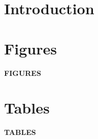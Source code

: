 \documentclass[11pt, a4paper]{article} %
\begin{document}
\newpage



\section{Introduction}\label{sec_mlch:introduction}

 
 

 


\newpage






\newpage
\TODO\section{Figures}
\vspace*{\fill}
{\Huge \begin{center}\textbf{FIGURES}\end{center}}
\vspace*{\fill}\clearpage







\newpage
\TODO\section{Tables}
\vspace*{\fill}
{\Huge \begin{center}\textbf{TABLES}\end{center}}
\vspace*{\fill}\clearpage
\end{document}
